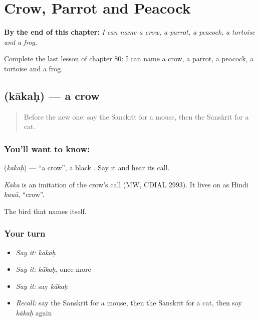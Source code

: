 
\chapter{Crow, Parrot and Peacock}
\label{ch:sa-crow-parrot-peacock}

\begin{chapteropening}
\textbf{By the end of this chapter:} \emph{I can name a crow, a parrot, a peacock, a tortoise and a frog.}

Complete the last lesson of chapter 80: I can name a crow, a parrot, a peacock, a tortoise and a frog.
\end{chapteropening}

\section[\texorpdfstring{\sk{काकः} (kākaḥ)}{काकः (kākaḥ)}]{ (kākaḥ) — a crow}

\label{lesson:SA-C80-crow}



\begin{quote}
Before the new one: say the Sanskrit for a mouse, then the Sanskrit for a cat.
\end{quote}

\subsection*{You'll want to know: }
\textbf{} (\emph{kākaḥ}) — \textquotedblleft{}a crow\textquotedblright{}, a black \textbf{}. Say it and hear its call.

\begin{cousinweb}
\emph{Kāka} is an imitation of the crow's call (MW, CDIAL 2993). It lives on as Hindi \emph{kauā}, \textquotedblleft{}crow\textquotedblright{}.
\end{cousinweb}

\begin{grammarlens}[title={What you've built}]
The bird that names itself.
\end{grammarlens}

\subsection*{Your turn}
\begin{itemize}
\raggedright
  \item \emph{Say it:} \emph{kākaḥ}
  \item \emph{Say it:} \emph{kākaḥ}, once more
  \item \emph{Say it:} say \emph{kākaḥ}
  \item \emph{Recall:} say the Sanskrit for a mouse, then the Sanskrit for a cat, then say \emph{kākaḥ} again
\end{itemize}

